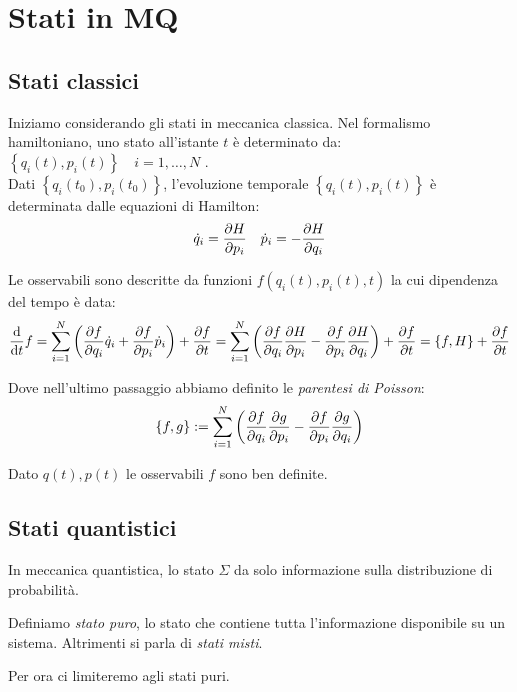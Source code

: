 \section{Stati in MQ}

\subsection{Stati classici}

Iniziamo considerando gli stati in meccanica classica.
Nel formalismo hamiltoniano, uno stato all'istante \(t\) 
è determinato da: \(\left\{ q_i(t), p_i(t) \right\}\quad i = 1,\dots, N\) .\\
Dati \(\left\{ q_i(t_0),p_i(t_0) \right\}\), l'evoluzione temporale \(\left\{ q_i(t), p_i(t)\right\}\) è determinata dalle equazioni di Hamilton:
\begin{equation}
    \dot{q}_i= \pdv{H}{p_i } \quad \dot{p}_i = -\pdv{H}{q_i }
\end{equation}

Le osservabili sono descritte da funzioni \(f(q_i(t),p_i(t),t)\) la cui dipendenza del tempo è data:
\[
\dv{t} f = \sum_{i=1}^{N} \left( \pdv{f}{q_i}\dot{q}_i+ \pdv{f}{p_i}\dot{p}_i  \right)  +\pdv{f}{t}
= \sum_{i=1}^{N} \left( \pdv{f}{q_i}\pdv{H}{p_i}-\pdv{f}{p_i}\pdv{H}{q_i} \right)+\pdv{f}{t}
= \left\{ f, H \right\} +\pdv{f}{t}
\]

Dove nell'ultimo passaggio abbiamo definito le \textit{parentesi di Poisson}:
\begin{equation}
    \left\{ f,g \right\}:= \sum_{i=1}^{N}\left( \pdv{f}{q_i}\pdv{g}{p_i}-\pdv{f}{p_i}\pdv{g}{q_i} \right)    
\end{equation}

\begin{remark}
    Dato \(q(t), p(t)\) le osservabili $f$ sono ben definite.
\end{remark}


\subsection{Stati quantistici}
In meccanica quantistica, lo stato \(\Sigma\) da solo informazione sulla distribuzione di probabilità.

\begin{definition}
    Definiamo \textit{stato puro}, lo stato che contiene tutta l'informazione disponibile su un sistema.
    Altrimenti si parla di \textit{stati misti}.
\end{definition}
Per ora ci limiteremo agli stati puri.

